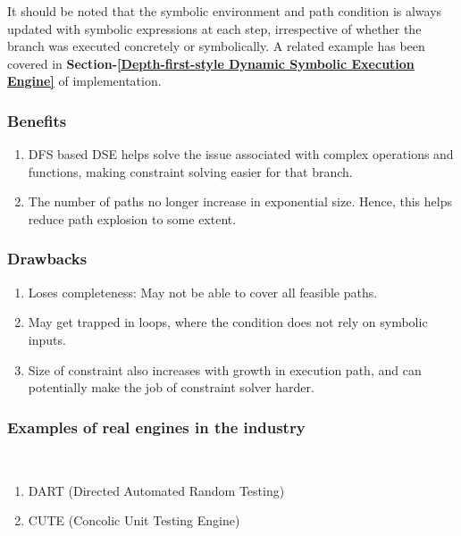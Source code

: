 \documentclass[11pt]{llncs}
\begin{document}
\begin{enumerate}
				It should be noted that the symbolic environment and path condition is always updated with symbolic expressions at each step, irrespective of whether the branch was executed concretely or symbolically. A related example has been covered in \textbf{Section-\ref{Depth-first-style Dynamic Symbolic Execution Engine}} of implementation.
		
				\subsubsection{Benefits}
					\begin{enumerate}
						\item DFS based DSE helps solve the issue associated with complex operations and functions, making constraint solving easier for that branch.
						\item  The number of paths no longer increase in exponential size. Hence, this helps reduce path explosion to some extent.

					\end{enumerate}
					
						
				\subsubsection{Drawbacks}
					\begin{enumerate}
						\item Loses completeness: May not be able to cover all feasible paths.
						\item May get trapped in loops, where the condition does not rely on symbolic inputs. \cite{1_Search_Strategies_DSE}
						\item Size of constraint also increases with growth in execution path, and can potentially make the job of constraint solver harder.
					\end{enumerate}
		
               	 		\vspace{-2mm}

				\subsubsection{Examples of real engines in the industry}\
					\begin{enumerate}
						\item DART (Directed Automated Random Testing) \cite{8_DART}
						\item CUTE (Concolic Unit Testing Engine) \cite{9_CUTE}
					\end{enumerate}


\end{enumerate}
\end{document}
